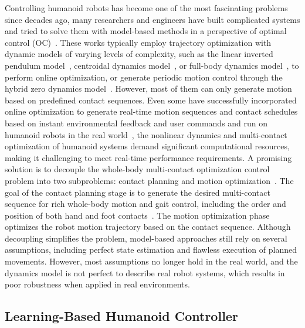 Controlling humanoid robots has become one of the most fascinating problems since decades ago, many researchers and engineers have built complicated systems and tried to solve them with model-based methods in a perspective of optimal control (OC)~\citep{2021ralFootstep, 2020rasRecedingHorizonPlanning, 2018troMulticontact, 2020troC-CROC, 2018Tower, 2020icraCrocoddyl, 2021troPatternGeneration}.
These works typically employ trajectory optimization with dynamic models of varying levels of complexity, such as the linear inverted pendulum model~\citep{kajita2010biped}, centroidal dynamics model~\citep{orin2013centroidal, wensing2016improved}, or full-body dynamics model~\citep{schultz2009modeling, 2015rasHRP-2humanoid, Xinjilefu}, to perform online optimization, or generate periodic motion control through the hybrid zero dynamics model~\citep{da2019combining,sreenath2011compliant, Hereid2016ICRA}. However, most of them can only generate motion based on predefined contact sequences. Even some have successfully incorporated online optimization to generate real-time motion sequences and contact schedules based on instant environmental feedback and user commands and run on humanoid robots in the real world~\citep{2019rasFootstep}, the nonlinear dynamics and multi-contact optimization of humanoid systems demand significant computational resources, making it challenging to meet real-time performance requirements.
A promising solution is to decouple the whole-body multi-contact optimization control problem into two subproblems: contact planning and motion optimization~\citep{2023troBiConMP, 2020icraCrocoddyl, AmesAaronDecopule}. The goal of the contact planning stage is to generate the desired multi-contact sequence for rich whole-body motion and gait control, including the order and position of both hand and foot contacts~\citep{2016rasmomentumdynamics, 2015rasHRP-2humanoid}. The motion optimization phase optimizes the robot motion trajectory based on the contact sequence. Although decoupling simplifies the problem, model-based approaches still rely on several assumptions, including perfect state estimation and flawless execution of planned movements. However, most assumptions no longer hold in the real world, and the dynamics model is not perfect to describe real robot systems, which results in poor robustness when applied in real environments.

\subsection{Learning-Based Humanoid Controller}


